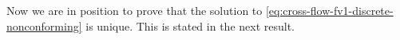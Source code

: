\documentclass[onefignum,onetabnum,reqno,a4paper,final]{siamart250211}
\newcommand\bu{\boldsymbol{u}}
\newcommand\bv{\boldsymbol{v}}
\newcommand\bw{\boldsymbol{w}}
\newcommand\0{\mathbf{0}}
\newcommand\bH{\boldsymbol{\mathrm{H}}}
\newcommand{\cred}[1]{{\leavevmode\color{red}{#1}}}
\numberwithin{figure}{section}
\numberwithin{table}{section}
\begin{document}
Now we are in position to prove that the solution to \eqref{eq:cross-flow-fv1-discrete-nonconforming} is unique. This is stated in the next result.
\end{document}

